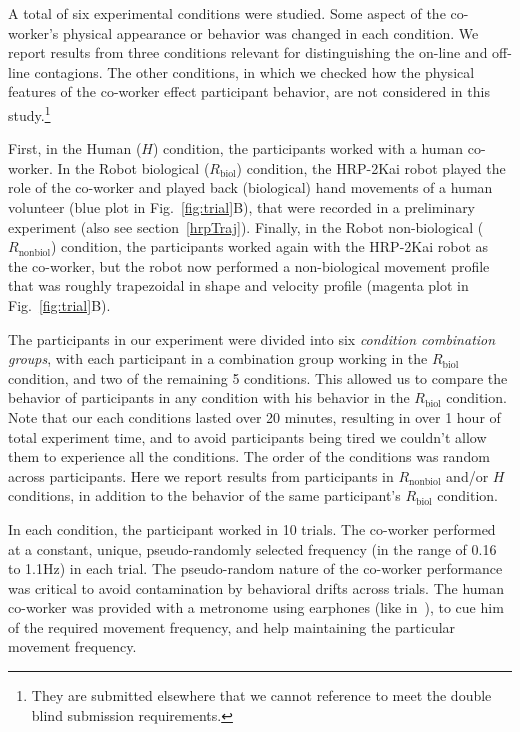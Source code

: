 \documentclass[a4paper, 12pt, oneside]{Thesis}  %
\begin{document}
A total of six experimental conditions were studied. Some aspect of the co-worker's physical appearance or behavior was changed in each condition. We report results from three conditions relevant for distinguishing the on-line and off-line contagions. The other conditions, in which we checked how the physical features of the co-worker effect participant behavior, are not considered in this study.\footnote{They are submitted elsewhere that we cannot reference to meet the double blind submission requirements.}

First, in the Human ($H$) condition, the participants worked with a human co-worker. In the Robot biological ($R_{\text{biol}}$) condition, the HRP-2Kai robot played the role of the co-worker and played back (biological) hand movements of a human volunteer (blue plot in Fig.~\ref{fig:trial}B), that were recorded in a preliminary experiment (also see section~\ref{hrpTraj}). Finally, in the Robot non-biological ($R_{\text{nonbiol}}$) condition, the participants worked again with the HRP-2Kai robot as the co-worker, but the robot now performed a non-biological movement profile that was roughly trapezoidal in shape and velocity profile (magenta plot in Fig.~\ref{fig:trial}B). 

The participants in our experiment were divided into six \emph{condition combination groups}, with each participant in a combination group working in the  $R_{\text{biol}}$ condition, and two of the remaining 5 conditions. This allowed us to compare the behavior of participants in any condition with his behavior in the $R_{\text{biol}}$ condition. Note that our each conditions lasted over 20 minutes, resulting in over 1 hour of total experiment time, and to avoid participants being tired we couldn't allow them to experience all the conditions. The order of the conditions was random across participants. Here we report results from participants in $R_{\text{nonbiol}}$ and/or $H$ conditions, in addition to the behavior of the same participant's $R_{\text{biol}}$ condition.

In each condition, the participant worked in 10 trials. The co-worker performed at a constant, unique, pseudo-randomly selected frequency (in the range of 0.16 to 1.1Hz) in each trial. The pseudo-random nature of the co-worker performance was critical to avoid contamination by behavioral drifts across trials. The human co-worker was provided with a metronome using earphones (like in~\cite{Bisio:PlosOne:2014}), to cue him of the required movement frequency, and help maintaining the particular movement frequency.
\end{document}
